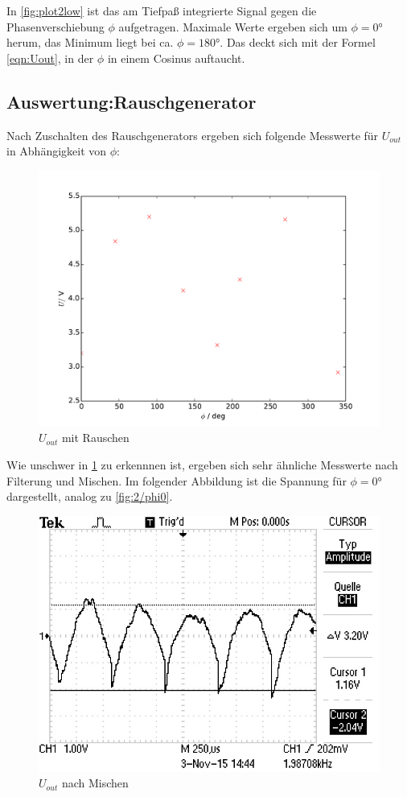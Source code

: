 In \ref{fig:plot2low} ist das am Tiefpaß integrierte Signal gegen die
Phasenverschiebung $\phi$ aufgetragen. Maximale Werte ergeben sich um $\phi = 0°$
herum, das Minimum liegt bei ca. $\phi = 180°$. Das deckt sich mit der Formel
\eqref{eqn:Uout}, in der $\phi$ in einem Cosinus auftaucht.

\subsection{Auswertung:Rauschgenerator}
Nach Zuschalten des Rauschgenerators ergeben sich folgende Messwerte für
$U_{out}$ in Abhängigkeit von $\phi$:
\begin{figure}
  \centering
  \includegraphics[width=\textwidth]{plot3u.pdf}
  \caption{$U_{out}$ mit Rauschen}
  \label{fig:plot3u}
\end{figure}

Wie unschwer in \ref{fig:plot3u} zu erkennnen ist, ergeben sich sehr ähnliche
Messwerte nach Filterung und Mischen. Im folgender Abbildung ist die
Spannung für $\phi=0°$ dargestellt, analog zu \ref{fig:2/phi0}.

\begin{figure}
  \centering
  \includegraphics[angle=90,width=\textwidth]{graphics/ALL0039/F0039TEK.jpg}
  \caption{$U_{out}$ nach Mischen}
  \label{fig:3/phi0}
\end{figure}

